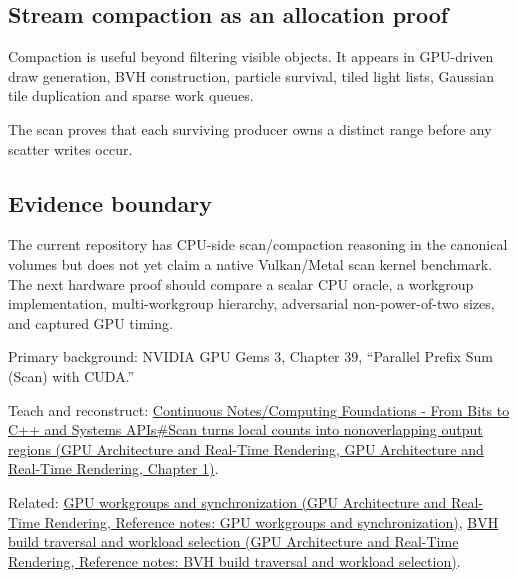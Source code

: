 \subsection{Stream compaction as an allocation proof}\label{appendix-f2ee4d086415-stream-compaction-as-an-allocation-proof}

Compaction is useful beyond filtering visible objects. It appears in GPU-driven draw generation, BVH construction, particle survival, tiled light lists, Gaussian tile duplication and sparse work queues.

The scan proves that each surviving producer owns a distinct range before any scatter writes occur.

\subsection{Evidence boundary}\label{appendix-f2ee4d086415-evidence-boundary}

The current repository has CPU-side scan/compaction reasoning in the canonical volumes but does not yet claim a native Vulkan/Metal scan kernel benchmark. The next hardware proof should compare a scalar CPU oracle, a workgroup implementation, multi-workgroup hierarchy, adversarial non-power-of-two sizes, and captured GPU timing.

Primary background: NVIDIA GPU Gems 3, Chapter 39, ``Parallel Prefix Sum (Scan) with CUDA.''

Teach and reconstruct: \href{../06-GPU-Architecture-and-Real-Time-Rendering/main.pdf\#nameddest=01-foundations-i-ch008-scan-turns-local-counts-into-nonoverlapping-output-regions}{Continuous Notes/Computing Foundations - From Bits to C++ and Systems APIs\#Scan turns local counts into nonoverlapping output regions (GPU Architecture and Real-Time Rendering, GPU Architecture and Real-Time Rendering, Chapter 1)}.

Related: \href{../06-GPU-Architecture-and-Real-Time-Rendering/main.pdf\#nameddest=appendix-f662b5b1773b}{GPU workgroups and synchronization (GPU Architecture and Real-Time Rendering, Reference notes: GPU workgroups and synchronization)}, \href{../06-GPU-Architecture-and-Real-Time-Rendering/main.pdf\#nameddest=appendix-5653a7aea6bb}{BVH build traversal and workload selection (GPU Architecture and Real-Time Rendering, Reference notes: BVH build traversal and workload selection)}.
